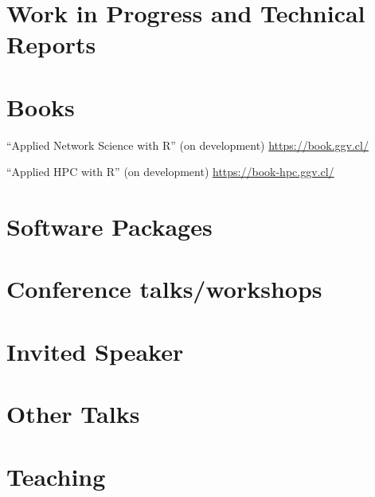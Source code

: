 \documentclass[letterpaper, 10pt]{article}
\begin{document}
\section*{Work in Progress and Technical Reports}

\printbibliography[title=\vskip-20pt,keyword=wip,resetnumbers=1]

\section*{Books}

\noindent ``Applied Network Science with R'' (on development) \url{https://book.ggv.cl/}

\noindent ``Applied HPC with R'' (on development) \url{https://book-hpc.ggv.cl/}


\section*{Software Packages}

\begin{enumerate}[label={[}\arabic*{]},labelindent=5\parindent,labelsep=8pt]

\end{enumerate}


\section*{Conference talks/workshops}

\printbibliography[title=\vskip-20pt,keyword=conferencetalk, resetnumbers=true]


\section*{Invited Speaker}

\printbibliography[title=\vskip-20pt,keyword=invitedtalk, resetnumbers=true]

\section*{Other Talks}

\printbibliography[title=\vskip-20pt,keyword=othertalk, resetnumbers=true]

\section*{Teaching}
\end{document}
